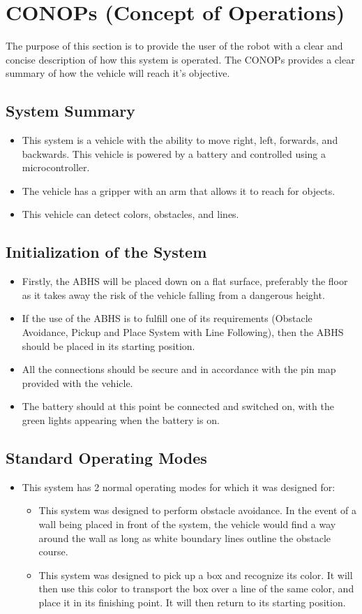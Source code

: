 \documentclass[11pt]{report}
\begin{document}
\chapter{CONOPs (Concept of Operations)}\label{ch:conops}
The purpose of this section is to provide the user of the robot with a clear and concise description of how this system is operated. The CONOPs provides a clear summary of how the vehicle will reach it's objective. 
\section{System Summary}
\begin{itemize}
    \item This system is a vehicle with the ability to move right, left, forwards, and backwards. This vehicle is powered by a battery and controlled using a microcontroller.
    \item The vehicle has a gripper with an arm that allows it to reach for objects. 
    \item This vehicle can detect colors, obstacles, and lines.
\end{itemize}
\section{Initialization of the System}
\begin{itemize}
    \item Firstly, the \gls{ABHS} will be placed down on a flat surface, preferably the floor as it takes away the risk of the vehicle falling from a dangerous height.
    \item If the use of the \gls{ABHS} is to fulfill one of its requirements (Obstacle Avoidance, Pickup and Place System with Line Following), then the \gls{ABHS} should be placed in its starting position.
    \item All the connections should be secure and in accordance with the pin map provided with the vehicle.
    \item The battery should at this point be connected and switched on, with the green lights appearing when the battery is on.
\end{itemize}

\section{Standard Operating Modes}
\begin{itemize}
\item This system has 2 normal operating modes for which it was designed for:
    \begin{itemize}
        \item This system was designed to perform obstacle avoidance. In the event of a wall being placed in front of the system, the vehicle would find a way around the wall as long as white boundary lines outline the obstacle course.
        \item This system was designed to pick up a box and recognize its color. It will then use this color to transport the box over a line of the same color, and place it in its finishing point. It will then return to its starting position. 
\end{itemize}
\end{itemize}
\end{document}
